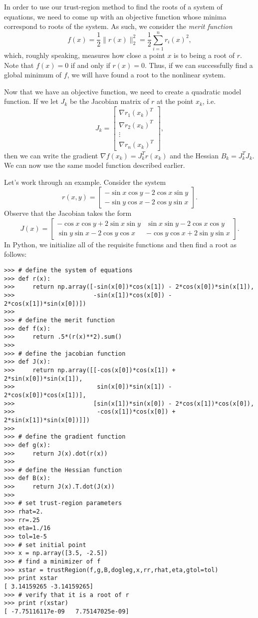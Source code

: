 In order to use our trust-region method to find the roots of a system
of equations, we need to come up with an objective function whose minima correspond to roots of the
system. As such, we consider the \emph{merit function}
\[
f(x) = \frac{1}{2}\|r(x)\|_2^2 = \frac{1}{2}\sum_{i=1}^nr_i(x)^2,
\]
which, roughly speaking, measures how close a point $x$ is to being a root of $r$. Note that $f(x) = 0$
if and only if $r(x) = 0$. Thus, if we can successfully find a global minimum of $f$, we will have
found a root to the nonlinear system.

Now that we have an objective function, we need to create a quadratic model function. If we let
$J_k$ be the Jacobian matrix of $r$ at the point $x_k$, i.e.
\[
J_k = \begin{bmatrix}
\nabla r_1(x_k)^T\\
\nabla r_2(x_k)^T\\
\vdots\\
\nabla r_n(x_k)^T
\end{bmatrix},
\]
then we can write the gradient $\nabla f(x_k) = J_k^Tr(x_k)$ and the Hessian $B_k = J_k^TJ_k$.
We can now use the same model function described earlier.

Let's work through an example. Consider the system
\[
r(x,y) = \begin{bmatrix}
-\sin x\cos y - 2\cos x\sin y\\
-\sin y\cos x - 2\cos y\sin x
\end{bmatrix}.
\]
Observe that the Jacobian takes the form
\[
J(x) = \begin{bmatrix}
-\cos x\cos y + 2\sin x\sin y & \sin x\sin y - 2\cos x\cos y\\
\sin y\sin x - 2\cos y\cos x & -\cos y\cos x + 2\sin y \sin x
\end{bmatrix}.
\]
In Python, we initialize all of the requisite functions and then find a root as follows:
\begin{lstlisting}
>>> # define the system of equations
>>> def r(x):
>>>     return np.array([-sin(x[0])*cos(x[1]) - 2*cos(x[0])*sin(x[1]),
>>>                      -sin(x[1])*cos(x[0]) - 2*cos(x[1])*sin(x[0])])
>>>
>>> # define the merit function
>>> def f(x):
>>>     return .5*(r(x)**2).sum()
>>>
>>> # define the jacobian function
>>> def J(x):
>>>     return np.array([[-cos(x[0])*cos(x[1]) + 2*sin(x[0])*sin(x[1]),
>>>                       sin(x[0])*sin(x[1]) - 2*cos(x[0])*cos(x[1])],
>>>                      [sin(x[1])*sin(x[0]) - 2*cos(x[1])*cos(x[0]),
>>>                       -cos(x[1])*cos(x[0]) + 2*sin(x[1])*sin(x[0])]])
>>>
>>> # define the gradient function
>>> def g(x):
>>>     return J(x).dot(r(x))
>>>
>>> # define the Hessian function
>>> def B(x):
>>>     return J(x).T.dot(J(x))
>>>
>>> # set trust-region parameters
>>> rhat=2.
>>> rr=.25
>>> eta=1./16
>>> tol=1e-5
>>> # set initial point
>>> x = np.array([3.5, -2.5])
>>> # find a minimizer of f
>>> xstar = trustRegion(f,g,B,dogleg,x,rr,rhat,eta,gtol=tol)
>>> print xstar
[ 3.14159265 -3.14159265]
>>> # verify that it is a root of r
>>> print r(xstar)
[ -7.75116117e-09   7.75147025e-09]
\end{lstlisting}

